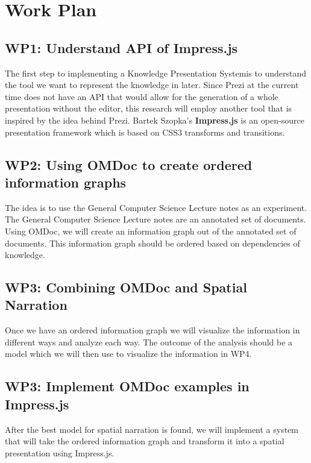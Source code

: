 \documentclass[twoside]{article}
\newcommand{\sys}{Knowledge Presentation System}
\begin{document}
\newpage

\section{Work Plan}
\subsection{WP1: Understand API of Impress.js}

The first step to implementing a \sys is to understand the tool we want to represent the knowledge in later. Since Prezi at the current time does not have an API that would allow for the generation of a whole presentation without the editor, this research will employ another tool that is inspired by the idea behind Prezi. Bartek Szopka's \textbf{Impress.js} is an open-source presentation framework which is based on CSS3 transforms and transitions.\cite{Impress} \\

\subsection{WP2: Using OMDoc to create ordered information graphs}
The idea is to use the General Computer Science Lecture notes as an experiment. The General Computer Science Lecture notes are an annotated set of documents. Using OMDoc, we will create an information graph out of the annotated set of documents. This information graph should be ordered based on dependencies of knowledge.\\

\subsection{WP3: Combining OMDoc and Spatial Narration}
Once we have an ordered information graph we will visualize the information in different ways and analyze each way. The outcome of the analysis should be a model which we will then use to visualize the information in WP4.\\

\subsection{WP3: Implement OMDoc examples in Impress.js}
After the best model for spatial narration is found, we will implement a system that will take the ordered information graph and transform it into a spatial presentation using Impress.js.
\end{document}
